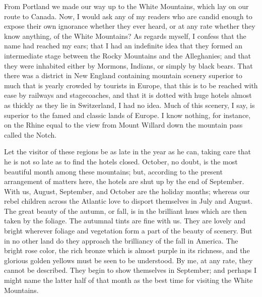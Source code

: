 From Portland we made our way up to the White Mountains, which lay
on our route to Canada.  Now, I would ask any of my readers who are
candid enough to expose their own ignorance whether they ever
heard, or at any rate whether they know anything, of the White
Mountains?  As regards myself, I confess that the name had reached
my ears; that I had an indefinite idea that they formed an
intermediate stage between the Rocky Mountains and the Alleghanies;
and that they were inhabited either by Mormons, Indians, or simply
by black bears.  That there was a district in New England
containing mountain scenery superior to much that is yearly crowded
by tourists in Europe, that this is to be reached with ease by
railways and stagecoaches, and that it is dotted with huge hotels
almost as thickly as they lie in Switzerland, I had no idea.  Much
of this scenery, I say, is superior to the famed and classic lands
of Europe.  I know nothing, for instance, on the Rhine equal to the
view from Mount Willard down the mountain pass called the Notch.

Let the visitor of these regions be as late in the year as he can,
taking care that he is not so late as to find the hotels closed.
October, no doubt, is the most beautiful month among these
mountains; but, according to the present arrangement of matters
here, the hotels are shut up by the end of September.  With us,
August, September, and October are the holiday months; whereas our
rebel children across the Atlantic love to disport themselves in
July and August.  The great beauty of the autumn, or fall, is in
the brilliant hues which are then taken by the foliage.  The
autumnal tints are fine with us.  They are lovely and bright
wherever foliage and vegetation form a part of the beauty of
scenery.  But in no other land do they approach the brilliancy of
the fall in America.  The bright rose color, the rich bronze which
is almost purple in its richness, and the glorious golden yellows
must be seen to be understood.  By me, at any rate, they cannot be
described.  They begin to show themselves in September; and perhaps
I might name the latter half of that month as the best time for
visiting the White Mountains.

